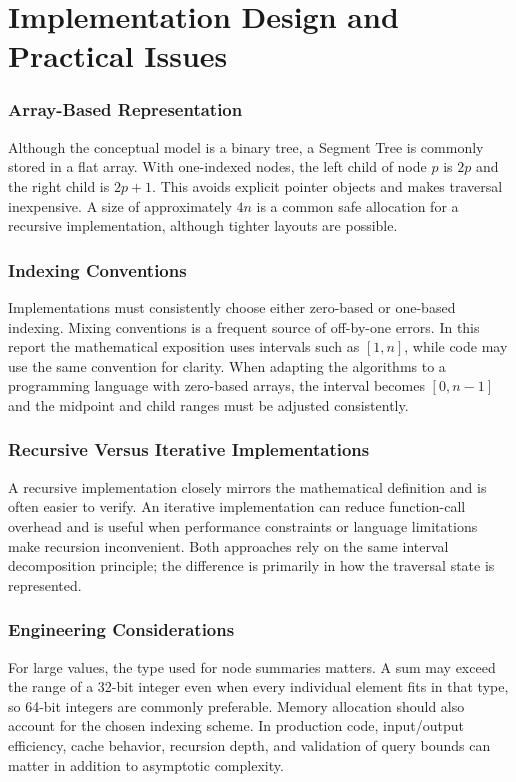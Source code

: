 \documentclass[11pt,open=any,headings=option]{scrreprt}
\begin{document}
\chapter{Implementation Design and Practical Issues}

\subsection{Array-Based Representation}
Although the conceptual model is a binary tree, a Segment Tree is commonly stored in a flat array. With one-indexed nodes, the left child of node $p$ is $2p$ and the right child is $2p+1$. This avoids explicit pointer objects and makes traversal inexpensive. A size of approximately $4n$ is a common safe allocation for a recursive implementation, although tighter layouts are possible.

\subsection{Indexing Conventions}
Implementations must consistently choose either zero-based or one-based indexing. Mixing conventions is a frequent source of off-by-one errors. In this report the mathematical exposition uses intervals such as $[1,n]$, while code may use the same convention for clarity. When adapting the algorithms to a programming language with zero-based arrays, the interval becomes $[0,n-1]$ and the midpoint and child ranges must be adjusted consistently.

\subsection{Recursive Versus Iterative Implementations}
A recursive implementation closely mirrors the mathematical definition and is often easier to verify. An iterative implementation can reduce function-call overhead and is useful when performance constraints or language limitations make recursion inconvenient. Both approaches rely on the same interval decomposition principle; the difference is primarily in how the traversal state is represented.

\subsection{Engineering Considerations}
For large values, the type used for node summaries matters. A sum may exceed the range of a 32-bit integer even when every individual element fits in that type, so 64-bit integers are commonly preferable. Memory allocation should also account for the chosen indexing scheme. In production code, input/output efficiency, cache behavior, recursion depth, and validation of query bounds can matter in addition to asymptotic complexity.
\end{document}
